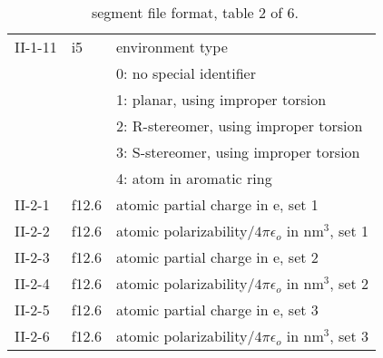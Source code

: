 \begin{table}[htbp]
\begin{center}
\begin{tabular*}{150mm}{p{12mm}p{12mm}l}
II-1-11 & i5     & environment type\\
        &        & 0: no special identifier\\
        &        & 1: planar, using improper torsion\\
        &        & 2: R-stereomer, using improper torsion\\
        &        & 3: S-stereomer, using improper torsion\\
        &        & 4: atom in aromatic ring\\
II-2-1  & f12.6  & atomic partial charge in e, set 1\\
II-2-2  & f12.6  & atomic polarizability/$4\pi\epsilon_o$ in nm$^3$, set 1\\
II-2-3  & f12.6  & atomic partial charge in e, set 2\\
II-2-4  & f12.6  & atomic polarizability/$4\pi\epsilon_o$ in nm$^3$, set 2\\
II-2-5  & f12.6  & atomic partial charge in e, set 3\\
II-2-6  & f12.6  & atomic polarizability/$4\pi\epsilon_o$ in nm$^3$, set 3\\
\hline
\end{tabular*}
\caption{\nwargos\ segment file format, table 2 of 6.\label{tbl:nwaseg2}}
\end{center}
\end{table}

